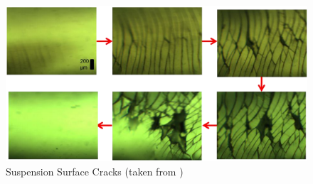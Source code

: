 \documentclass[twoside,a4]{report}
\begin{document}
	\begin{figure}[!htb]
		\centering
		\includegraphics[scale=0.4]{images/cfors_cracks.png}
		\caption{Suspension Surface Cracks (taken from \cite{thescforsyth})}
		\label{cforscracks}
	\end{figure}
	
\end{document}
